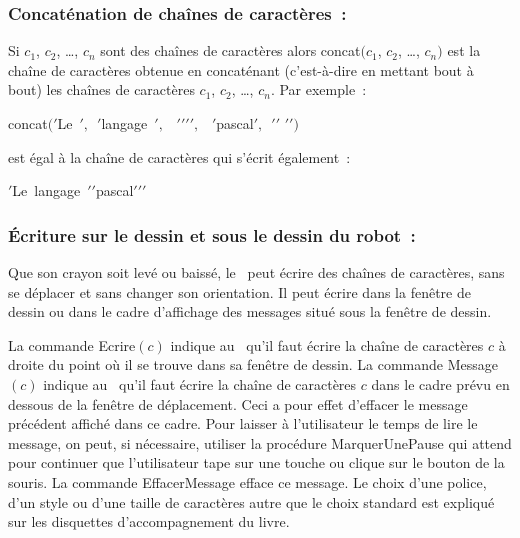 \subsubsection{Concaténation de chaînes de caractères~:}
Si $c_{1}$, $c_{2}$, \ldots, $c_{n}$ sont des chaînes de
caractères alors {\idt concat$(c_{1}$, $c_{2}$, \ldots, $c_{n})$} est la chaîne de
caractères obtenue en concaténant (c'est-à-dire en mettant bout à bout) les chaînes de
caractères $c_{1}$, $c_{2}$, \ldots, $c_{n}$. Par exemple~:
\begin{center}
{\idt concat$($\cha $\scriptstyle '$Le\ \idt $\scriptstyle ',$\ \cha $\scriptstyle '$langage\ \idt $\scriptstyle ',$\ %
\cha $\scriptstyle '$\idt $\scriptstyle '$\cha $\scriptstyle '$\idt $\scriptstyle ',$\ %
\cha $\scriptstyle '$pascal\idt $\scriptstyle ',$\ \cha $\scriptstyle '$\idt $\scriptstyle '$%
\cha $\scriptstyle '$\idt $\scriptstyle ')$}
\end{center}
est égal à la chaîne de caractères qui s'écrit également~:
\begin{center}
{\cha $\scriptstyle '$Le\ langage\ \idt $\scriptstyle '$\cha $\scriptstyle '$pascal\idt $\scriptstyle '$\cha $\scriptstyle '$\idt $\scriptstyle '$}
\end{center}

\subsubsection{Écriture sur le dessin et sous le dessin du robot~:}
Que son crayon soit levé ou baissé, le \robot\ peut écrire des chaînes de ca\-rac\-tè\-res,  
sans se déplacer et sans changer son orientation. Il peut écrire dans la fenêtre de dessin ou dans le cadre d'affichage des
messages situé sous la fenêtre de dessin.

La commande {\idt Ecrire$(c)$} indique au \robot\ qu'il faut écrire la chaîne de caractères $c$ à droite du point
où il se trouve dans sa fenêtre de dessin.
La commande {\idt Message$(c)$} indique au \robot\ qu'il faut écrire la chaîne de ca\-rac\-tè\-res $c$ dans le
cadre prévu en dessous de la fenêtre de déplacement. Ceci a pour effet d'effacer le message précédent 
affiché dans ce
cadre. Pour laisser à l'utilisateur le temps de lire le message, on peut, si nécessaire, utiliser la procédure
{\idt  MarquerUnePause} qui attend pour continuer que l'utilisateur tape sur une touche ou clique sur le bouton de la 
souris. La commande {\idt  EffacerMessage} efface ce message. Le choix d'une police, d'un style ou d'une taille de
caractères autre que le choix standard est expliqué sur les disquettes d'accompagnement du livre.

